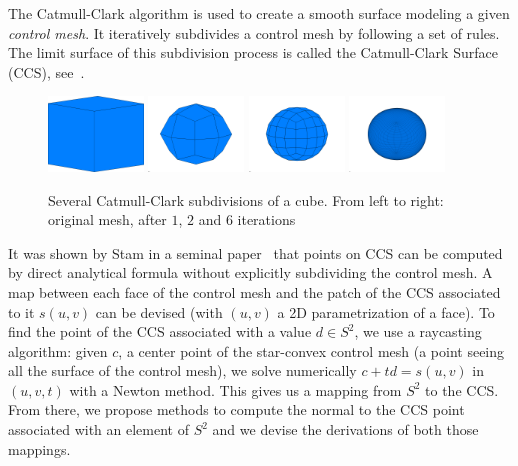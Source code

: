 The Catmull-Clark algorithm is used to create a smooth surface modeling a given \emph{control mesh}.
It iteratively subdivides a control mesh by following a set of rules.
The limit surface of this subdivision process is called the Catmull-Clark Surface (CCS), see~.
\begin{figure}
\centering
  \includegraphics[height = 2cm]{cube1.png}
  \includegraphics[height = 2cm, trim=20pt 0 50pt 0, clip]{cube2.png}
  \includegraphics[height = 2cm, trim=50pt 0 50pt 0, clip]{cube3.png}
  \includegraphics[height = 2cm, trim=50pt 0 50pt 0, clip]{cube4.png}
\caption{Several Catmull-Clark subdivisions of a cube. From left to right: original mesh, after $1$, $2$ and $6$ iterations}
\label{fig:CCIterations}
\end{figure}
It was shown by Stam in a seminal paper~\cite{stam:siggraph:1998} that points on CCS can be computed by direct analytical formula without explicitly subdividing the control mesh.
A map between each face of the control mesh and the patch of the CCS associated to it $s(u,v)$ can be devised (with $(u,v)$ a 2D parametrization of a face).
To find the point of the CCS associated with a value $d \in S^2$, we use a raycasting algorithm: given $c$, a center point of the star-convex control mesh (a point seeing all the surface of the control mesh), we solve numerically $c+td=s(u,v)$ in $(u,v,t)$ with a Newton method.
This gives us a mapping from $S^2$ to the CCS.
From there, we propose methods to compute the normal to the CCS point associated with an element of $S^2$ and we devise the derivations of both those mappings.

